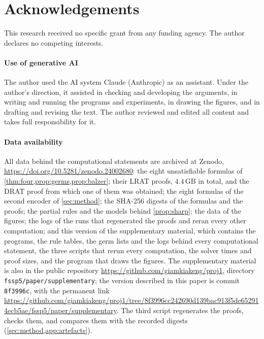 \FloatBarrier
\section*{Acknowledgements}
This research received no specific grant from any funding agency. The author
declares no competing interests.

\paragraph{Use of generative AI}
The author used the AI system Claude (Anthropic) as an assistant. Under the
author's direction, it assisted in checking and developing the arguments, in
writing and running the programs and experiments, in drawing the figures, and in
drafting and revising the text. The author reviewed and edited all content and
takes full responsibility for it.

\paragraph{Data availability}
{\sloppy All data behind the computational statements are archived at Zenodo,
\url{https://doi.org/10.5281/zenodo.24002680}: the eight unsatisfiable formulas
of \cref{thm:four,prop:germs,prop:balzer}; their LRAT proofs, $4.4$\,GB in
total, and the DRAT proof from which one of them was obtained; the eight
formulas of the second encoder of \cref{sec:method}; the SHA-256 digests of the
formulas and the proofs; the partial rules and the models behind
\cref{prop:sharp}; the data of the figures; the logs of the runs that
regenerated the proofs and reran every other computation; and this version of
the supplementary
material, which contains the programs, the rule tables, the germ lists and the
logs behind every computational statement, the three scripts that rerun every
computation, the solver times and proof sizes, and the program that draws the
figures. The supplementary material is also in the public repository
\url{https://github.com/giamkiakeng/proj1}, directory
\texttt{fssp5/paper/supplementary}; the version described in this paper is
commit \texttt{8f3996c}, with the permanent link
\url{https://github.com/giamkiakeng/proj1/tree/8f3996cc242690d139bac913f5de652914ecb5ae/fssp5/paper/supplementary}.
The third script regenerates the proofs, checks them, and compares them with the
recorded digests (\cref{sec:method,app:artefacts}).\par}


